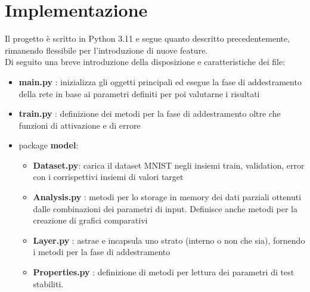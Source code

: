\chapter{Implementazione}
Il progetto è scritto in Python 3.11 e segue quanto descritto precedentemente, rimanendo flessibile per l'introduzione di nuove feature. \\
Di seguito una breve introduzione della disposizione e caratteristiche dei file:
\begin{itemize}
    \item \textbf{main.py} : inizializza gli oggetti principali ed esegue la fase di addestramento della rete in base ai parametri definiti per poi valutarne i risultati
    \item \textbf{train.py} : definizione dei metodi per la fase di addestramento oltre che funzioni di attivazione e di errore
    \item package \textbf{model}:
    \begin{itemize}
        \item \textbf{Dataset.py}: carica il dataset MNIST negli insiemi train, validation, error con i corrispettivi insiemi di valori target 
        \item \textbf{Analysis.py} : metodi per lo storage in memory dei dati parziali ottenuti dalle combinazioni dei parametri di input. Definisce anche metodi per la creazione di grafici comparativi
        \item \textbf{Layer.py} : astrae e incapsula uno strato (interno o non che sia), fornendo i metodi per la fase di addestramento
        \item \textbf{Properties.py} : definizione di metodi per lettura dei parametri di test stabiliti.
    \end{itemize}
\end{itemize}

